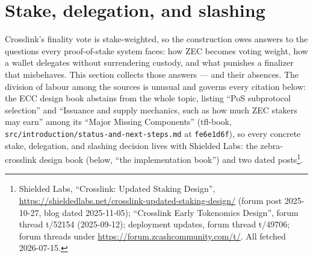 \documentclass[11pt,a4paper]{article}
\theoremstyle{definition}
\begin{document}

\section{Stake, delegation, and slashing}\label{sec:xl-stake}

Crosslink's finality vote is stake-weighted, so the construction owes
answers to the questions every proof-of-stake system faces: how ZEC becomes
voting weight, how a wallet delegates without surrendering custody, and
what punishes a finalizer that misbehaves. This section collects those
answers --- and their absences. The division of labour among the sources is
unusual and governs every citation below: the ECC design book abstains from
the whole topic, listing ``PoS subprotocol selection'' and ``Issuance and
supply mechanics, such as how much ZEC stakers may earn'' among its
``Major Missing Components'' (tfl-book,
\texttt{src/introduction/status-and-next-steps.md} at \texttt{fe6e1d6f}),
so every concrete stake, delegation, and slashing decision lives with
Shielded Labs: the zebra-crosslink design book (below, ``the implementation
book'') and two dated posts\footnote{Shielded Labs, ``Crosslink: Updated
Staking Design'',
\url{https://shieldedlabs.net/crosslink-updated-staking-design/} (forum
post 2025-10-27, blog dated 2025-11-05); ``Crosslink Early Tokenomics
Design'', forum thread t/52154 (2025-09-12); deployment updates, forum
thread t/49706; forum threads under
\url{https://forum.zcashcommunity.com/t/}. All fetched 2026-07-15.}.
\end{document}
